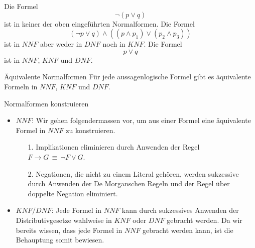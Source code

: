 \begin{example}
    Die Formel
    \[
        \neg(p\lor q)
    \]
    ist in keiner der oben eingeführten Normalformen. Die Formel
    \[
        (\neg p\lor q)\land ((p\land p_1)\lor(p_2\land p_3))
    \]
    ist in $NNF$ aber weder in $DNF$ noch in $KNF$. Die Formel
    \[
        p\lor q
    \]
    ist in $NNF$, $KNF$ und $DNF$.
\end{example}

\begin{lemma}{Äquivalente Normalformen}
    Für jede aussagenlogische Formel gibt es äquivalente Formeln in $NNF$, $KNF$ und $DNF$.
\end{lemma}

\begin{howto}{Normalformen konstruieren}
    \begin{itemize}
        \item $NNF$: Wir gehen folgendermassen vor, um aus einer Formel eine äquivalente Formel in $NNF$ zu konstruieren.
            \begin{enumerate}
                \item[1.] Implikationen eliminieren durch Anwenden der Regel $F\to G\,\equiv\,\neg F\lor G$.
                \item[2.] Negationen, die nicht zu einem Literal gehören, werden sukzessive durch Anwenden der De Morganschen Regeln und der Regel über doppelte Negation eliminiert.
            \end{enumerate}
        \item $KNF/DNF$: Jede Formel in $NNF$ kann durch sukzessives Anwenden der Distributivgesetze wahlweise in $KNF$ oder $DNF$ gebracht werden. Da wir bereits wissen, dass jede Formel in $NNF$ gebracht werden kann, ist die Behauptung somit bewiesen.
    \end{itemize}
\end{howto}

